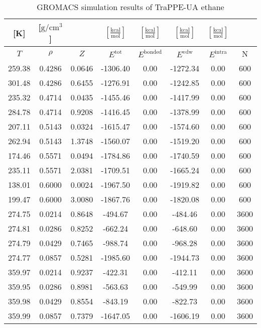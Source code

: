 \documentclass[%
 aip,
 jcp,
 sd,%
 amsmath,amssymb,
]{revtex4-1}
\begin{document}
\begin{table*}[!htbp]
\centering
\caption{GROMACS simulation results of TraPPE-UA ethane }
\label{tab:sim-res-TraPPE-C2-gmx}
\begin{ruledtabular}
\begin{tabular}{cccccccc}
[K] & [$\mathrm{g/cm^3}$] &  & $[\frac{\mathrm{kcal}}{\mathrm{mol}}]$ & $[\frac{\mathrm{kcal}}{\mathrm{mol}}]$ & $[\frac{\mathrm{kcal}}{\mathrm{mol}}]$ & $[\frac{\mathrm{kcal}}{\mathrm{mol}}]$ &  \\
\hline
$T$ & $\rho$ & $Z$ & $E^{\mathrm{tot}}$ & $E^{\mathrm{bonded}}$ & $E^{\mathrm{vdw}}$ & $E^{\mathrm{intra}}$ & N\\
\hline
259.38	&	0.4286	&	0.0646	&	-1306.40	&	0.00	&	-1272.34	&	0.00	&	600	\\
301.48	&	0.4286	&	0.6455	&	-1276.91	&	0.00	&	-1242.85	&	0.00	&	600	\\
235.32	&	0.4714	&	0.0435	&	-1455.46	&	0.00	&	-1417.99	&	0.00	&	600	\\
284.78	&	0.4714	&	0.9208	&	-1416.45	&	0.00	&	-1378.99	&	0.00	&	600	\\
207.11	&	0.5143	&	0.0324	&	-1615.47	&	0.00	&	-1574.60	&	0.00	&	600	\\
262.94	&	0.5143	&	1.3748	&	-1560.07	&	0.00	&	-1519.20	&	0.00	&	600	\\
174.46	&	0.5571	&	0.0494	&	-1784.86	&	0.00	&	-1740.59	&	0.00	&	600	\\
235.11	&	0.5571	&	2.0381	&	-1709.51	&	0.00	&	-1665.24	&	0.00	&	600	\\
138.01	&	0.6000	&	0.0024	&	-1967.50	&	0.00	&	-1919.82	&	0.00	&	600	\\
199.47	&	0.6000	&	3.0080	&	-1867.76	&	0.00	&	-1820.08	&	0.00	&	600	\\
274.75	&	0.0214	&	0.8648	&	-494.67	&	0.00	&	-484.46	&	0.00	&	3600	\\
274.81	&	0.0286	&	0.8252	&	-662.24	&	0.00	&	-648.60	&	0.00	&	3600	\\
274.79	&	0.0429	&	0.7465	&	-988.74	&	0.00	&	-968.28	&	0.00	&	3600	\\
274.77	&	0.0857	&	0.5281	&	-1985.60	&	0.00	&	-1944.73	&	0.00	&	3600	\\
359.97	&	0.0214	&	0.9237	&	-422.31	&	0.00	&	-412.11	&	0.00	&	3600	\\
359.95	&	0.0286	&	0.8981	&	-563.63	&	0.00	&	-549.99	&	0.00	&	3600	\\
359.98	&	0.0429	&	0.8554	&	-843.19	&	0.00	&	-822.73	&	0.00	&	3600	\\
359.99	&	0.0857	&	0.7379	&	-1647.05	&	0.00	&	-1606.19	&	0.00	&	3600	\\

\end{tabular}
\end{ruledtabular}
\end{table*}
\end{document}
